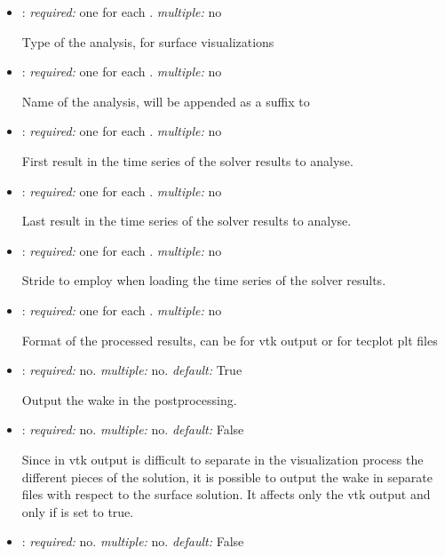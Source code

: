 \begin{itemize}
\item {}: \textit{required:} one for each . \textit{multiple:} no

Type of the analysis,  for surface visualizations

\item {}: \textit{required:} one for each . \textit{multiple:} no

Name of the analysis, will be appended as a suffix to 

\item {}: \textit{required:} one for each . \textit{multiple:} no

First result in the time series of the solver results to analyse.

\item {}: \textit{required:} one for each . \textit{multiple:} no

Last result in the time series of the solver results to analyse.

\item {}: \textit{required:} one for each . \textit{multiple:} no

Stride to employ when loading the time series of the solver results. 

\item {}: \textit{required:} one for each . \textit{multiple:} no

Format of the processed results, can be  for vtk output or  for tecplot plt files

\item {}: \textit{required:} no. \textit{multiple:} no. \textit{default:} True

Output the wake in the postprocessing.

\item {}: \textit{required:} no. \textit{multiple:} no. \textit{default:} False

Since in vtk output is difficult to separate in the visualization process the different pieces of the solution, it is possible to output the wake in separate files with respect to the surface solution. It affects only the vtk output and only if  is set to true.

\item {}: \textit{required:} no. \textit{multiple:} no. \textit{default:} False


\end{itemize}
